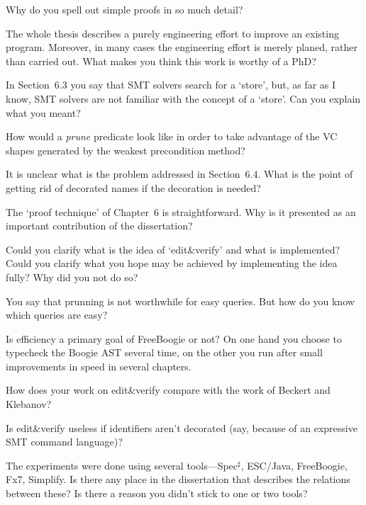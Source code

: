 \Q Why do you spell out simple proofs in so much detail?

\Q The whole thesis describes a purely engineering effort to improve an
existing program. Moreover, in many cases the engineering effort is merely
planed, rather than carried out. What makes you think this work is worthy
of a PhD?

\Q In Section~6.3 you say that SMT solvers search for a `store', but, as
far as I know, SMT solvers are not familiar with the concept of a `store'.
Can you explain what you meant?

\Q How would a {\it prune\/} predicate look like in order to take advantage
of the VC shapes generated by the weakest precondition method?

\Q It is unclear what is the problem addressed in Section~6.4. What is the
point of getting rid of decorated names if the decoration is needed?


\Q The `proof technique' of Chapter~6 is straightforward. Why is it
presented as an important contribution of the dissertation?


\Q Could you clarify what is the idea of `edit\&verify' and what is
implemented? Could you clarify what you hope may be achieved by
implementing the idea fully? Why did you not do so?

\Q You say that prunning is not worthwhile for easy queries. But how do you
know which queries are easy?


\Q Is efficiency a primary goal of FreeBoogie or not? On one hand you choose
to typecheck the Boogie AST several time, on the other you run after small
improvements in speed in several chapters.


\Q How does your work on edit\&verify compare with the work of Beckert and
Klebanov?

\Q Is edit\&verify useless if identifiers aren't decorated (say, because of
an expressive SMT command language)?

\Q The experiments were done using several tools---Spec$^\sharp$, ESC/Java,
FreeBoogie, Fx7, Simplify. Is there any place in the dissertation that
describes the relations between these? Is there a reason you didn't stick
to one or two tools?

\bye
